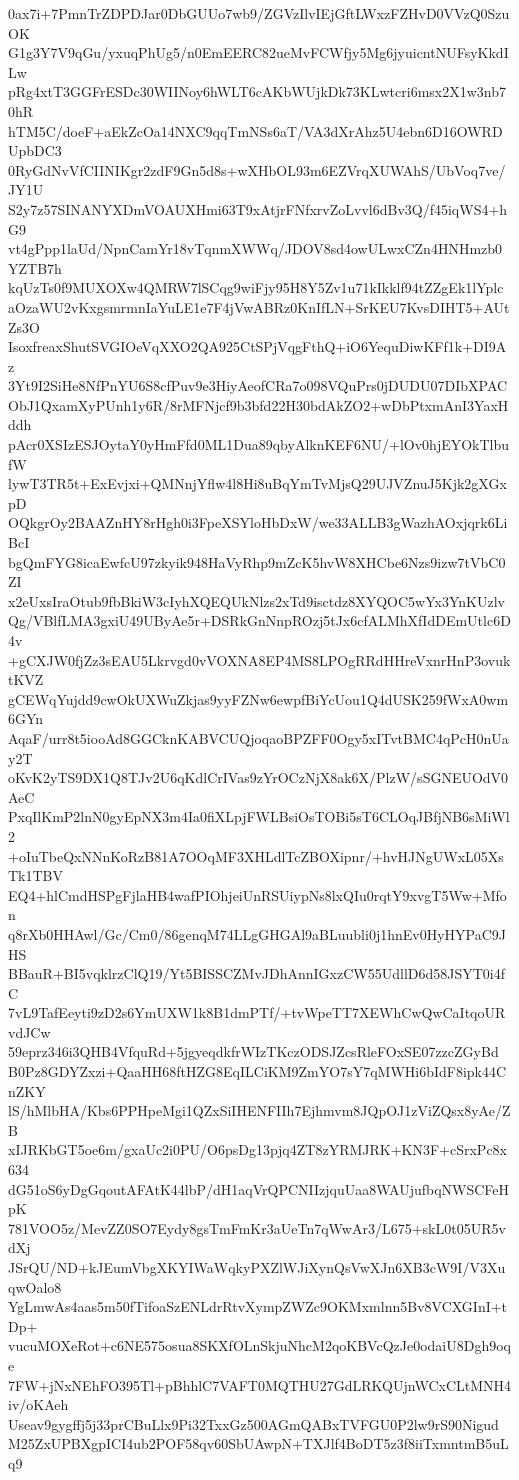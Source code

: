 0ax7i+7PmnTrZDPDJar0DbGUUo7wb9/ZGVzIlvIEjGftLWxzFZHvD0VVzQ0SzuOK
G1g3Y7V9qGu/yxuqPhUg5/n0EmEERC82ueMvFCWfjy5Mg6jyuicntNUFsyKkdILw
pRg4xtT3GGFrESDc30WIINoy6hWLT6cAKbWUjkDk73KLwtcri6msx2X1w3nb70hR
hTM5C/doeF+aEkZcOa14NXC9qqTmNSs6aT/VA3dXrAhz5U4ebn6D16OWRDUpbDC3
0RyGdNvVfCIINIKgr2zdF9Gn5d8s+wXHbOL93m6EZVrqXUWAhS/UbVoq7ve/JY1U
S2y7z57SINANYXDmVOAUXHmi63T9xAtjrFNfxrvZoLvvl6dBv3Q/f45iqWS4+hG9
vt4gPpp1laUd/NpnCamYr18vTqnmXWWq/JDOV8sd4owULwxCZn4HNHmzb0YZTB7h
kqUzTs0f9MUXOXw4QMRW7lSCqg9wiFjy95H8Y5Zv1u71kIkklf94tZZgEk1lYplc
aOzaWU2vKxgsmrmnIaYuLE1e7F4jVwABRz0KnIfLN+SrKEU7KvsDIHT5+AUtZs3O
IsoxfreaxShutSVGIOeVqXXO2QA925CtSPjVqgFthQ+iO6YequDiwKFf1k+DI9Az
3Yt9I2SiHe8NfPnYU6S8cfPuv9e3HiyAeofCRa7o098VQuPrs0jDUDU07DIbXPAC
ObJ1QxamXyPUnh1y6R/8rMFNjcf9b3bfd22H30bdAkZO2+wDbPtxmAnI3YaxHddh
pAcr0XSIzESJOytaY0yHmFfd0ML1Dua89qbyAlknKEF6NU/+lOv0hjEYOkTlbufW
lywT3TR5t+ExEvjxi+QMNnjYflw4l8Hi8uBqYmTvMjsQ29UJVZnuJ5Kjk2gXGxpD
OQkgrOy2BAAZnHY8rHgh0i3FpeXSYloHbDxW/we33ALLB3gWazhAOxjqrk6LiBcI
bgQmFYG8icaEwfcU97zkyik948HaVyRhp9mZcK5hvW8XHCbe6Nzs9izw7tVbC0ZI
x2eUxsIraOtub9fbBkiW3cIyhXQEQUkNlzs2xTd9isctdz8XYQOC5wYx3YnKUzlv
Qg/VBlfLMA3gxiU49UByAe5r+DSRkGnNnpROzj5tJx6cfALMhXfIdDEmUtlc6D4v
+gCXJW0fjZz3sEAU5Lkrvgd0vVOXNA8EP4MS8LPOgRRdHHreVxnrHnP3ovuktKVZ
gCEWqYujdd9cwOkUXWuZkjas9yyFZNw6ewpfBiYcUou1Q4dUSK259fWxA0wm6GYn
AqaF/urr8t5iooAd8GGCknKABVCUQjoqaoBPZFF0Ogy5xITvtBMC4qPcH0nUay2T
oKvK2yTS9DX1Q8TJv2U6qKdlCrIVas9zYrOCzNjX8ak6X/PlzW/sSGNEUOdV0AeC
PxqIlKmP2lnN0gyEpNX3m4Ia0fiXLpjFWLBsiOsTOBi5sT6CLOqJBfjNB6sMiWl2
+oIuTbeQxNNnKoRzB81A7OOqMF3XHLdlTcZBOXipnr/+hvHJNgUWxL05XsTk1TBV
EQ4+hlCmdHSPgFjlaHB4wafPIOhjeiUnRSUiypNs8lxQIu0rqtY9xvgT5Ww+Mfon
q8rXb0HHAwl/Gc/Cm0/86genqM74LLgGHGAl9aBLuubli0j1hnEv0HyHYPaC9JHS
BBauR+BI5vqklrzClQ19/Yt5BISSCZMvJDhAnnIGxzCW55UdllD6d58JSYT0i4fC
7vL9TafEeyti9zD2s6YmUXW1k8B1dmPTf/+tvWpeTT7XEWhCwQwCaItqoURvdJCw
59eprz346i3QHB4VfquRd+5jgyeqdkfrWIzTKczODSJZcsRleFOxSE07zzcZGyBd
B0Pz8GDYZxzi+QaaHH68ftHZG8EqILCiKM9ZmYO7sY7qMWHi6bIdF8ipk44CnZKY
lS/hMlbHA/Kbs6PPHpeMgi1QZxSiIHENFIIh7Ejhmvm8JQpOJ1zViZQsx8yAe/ZB
xIJRKbGT5oe6m/gxaUc2i0PU/O6psDg13pjq4ZT8zYRMJRK+KN3F+cSrxPc8x634
dG51oS6yDgGqoutAFAtK44lbP/dH1aqVrQPCNIIzjquUaa8WAUjufbqNWSCFeHpK
781VOO5z/MevZZ0SO7Eydy8gsTmFmKr3aUeTn7qWwAr3/L675+skL0t05UR5vdXj
JSrQU/ND+kJEumVbgXKYIWaWqkyPXZlWJiXynQsVwXJn6XB3cW9I/V3XuqwOalo8
YgLmwAs4aas5m50fTifoaSzENLdrRtvXympZWZc9OKMxmlnn5Bv8VCXGInI+tDp+
vucuMOXeRot+c6NE575osua8SKXfOLnSkjuNhcM2qoKBVcQzJe0odaiU8Dgh9oqe
7FW+jNxNEhFO395Tl+pBhhlC7VAFT0MQTHU27GdLRKQUjnWCxCLtMNH4iv/oKAeh
Useav9gygffj5j33prCBuLlx9Pi32TxxGz500AGmQABxTVFGU0P2lw9rS90Nigud
M25ZxUPBXgpICI4ub2POF58qv60SbUAwpN+TXJlf4BoDT5z3f8iiTxmntmB5uLq9
